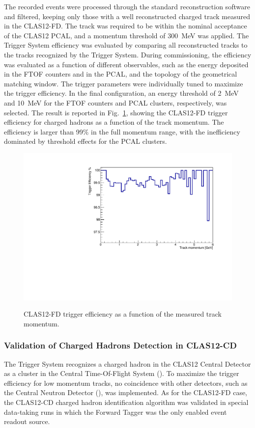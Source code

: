 The recorded events were processed through the standard reconstruction software and filtered, keeping only those with a well reconstructed charged track measured in the CLAS12-FD. The track was required to be within the nominal acceptance of the CLAS12 PCAL, and a momentum threshold of 300~MeV was applied. The Trigger System efficiency was evaluated by comparing all reconstructed tracks to the tracks recognized by the Trigger System. During commissioning, the efficiency was evaluated as a function of different observables, such as the energy deposited in the FTOF counters and in the PCAL, and the topology of the geometrical matching window. The trigger parameters were individually tuned to maximize the trigger efficiency. In the final configuration, an energy threshold of 2~MeV and 10~MeV for the FTOF counters and PCAL clusters, respectively, was selected. The result is reported in Fig.~\ref{fig:FD_TrackEfficiency}, showing the CLAS12-FD trigger efficiency for charged hadrons as a function of the track momentum. The efficiency is larger than 99$\%$ in the full momentum range, with the inefficiency dominated by threshold effects for the PCAL clusters.

\begin{figure}[!htb]
 \centering
{\includegraphics[width=.5\textwidth]{img/FD_TrackEfficiency.pdf}}
 \caption{CLAS12-FD trigger efficiency as a function of the measured track momentum.}
 \label{fig:FD_TrackEfficiency}
\end{figure}

\subsubsection{Validation of Charged Hadrons Detection in CLAS12-CD}

The Trigger System recognizes a charged hadron in the CLAS12 Central Detector as a cluster in the Central Time-Of-Flight System (\cite{ctof-ref}). To maximize the trigger efficiency for low momentum tracks, no coincidence with other detectors, such as the Central Neutron Detector (\cite{cnd-ref}), was implemented. As for the CLAS12-FD case, the CLAS12-CD charged hadron identification algorithm was validated in special data-taking runs in which the Forward Tagger was the only enabled event readout source.  

